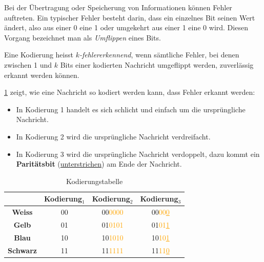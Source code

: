 Bei der Übertragung oder Speicherung von Informationen können
Fehler auftreten. Ein typischer Fehler besteht darin, dass ein
einzelnes Bit seinen Wert ändert, also aus einer 0 eine 1 oder
umgekehrt aus einer 1 eine 0 wird. Diesen Vorgang bezeichnet
man als \emph{Umflippen} eines Bits.

\begin{mydefinition}
	Eine Kodierung heisst \emph{\(k\)-fehlererkennend}, wenn sämtliche
	Fehler, bei denen zwischen 1 und \(k\) Bits einer kodierten
	Nachricht umgeflippt werden, zuverlässig erkannt werden können.
\end{mydefinition}



\begin{myexample}\label{ex:code-kerk}
	\cref{tab:codes} zeigt, wie eine Nachricht so kodiert werden kann, dass Fehler erkannt werden:
	\begin{itemize}
		\item In Kodierung 1 handelt es sich schlicht und einfach um die ursprüngliche Nachricht.
		\item In Kodierung 2 wird die ursprüngliche Nachricht verdreifacht.
		\item In Kodierung 3 wird die ursprüngliche Nachricht verdoppelt, dazu kommt ein \textbf{Paritätsbit} (\underline{unterstrichen}) am Ende der Nachricht.
	\end{itemize}
	\begin{table}[H]
		\centering
		\begin{tabular}{c|c|c|c}
			                 & \textbf{Kodierung\(_1\)} & \textbf{Kodierung\(_2\)}   & \textbf{Kodierung\(_3\)}              \\
			\midrule\midrule
			\textbf{Weiss}   & 00                       & 00\textcolor{orange}{0000} & 00\textcolor{orange}{00\underline{0}} \\
			\midrule
			\textbf{Gelb}    & 01                       & 01\textcolor{orange}{0101} & 01\textcolor{orange}{01\underline{1}} \\
			\midrule
			\textbf{Blau}    & 10                       & 10\textcolor{orange}{1010} & 10\textcolor{orange}{10\underline{1}} \\
			\midrule
			\textbf{Schwarz} & 11                       & 11\textcolor{orange}{1111} & 11\textcolor{orange}{11\underline{0}} \\
		\end{tabular}
		\caption{Kodierungstabelle}
		\label{tab:codes}
	\end{table}


\end{myexample}

